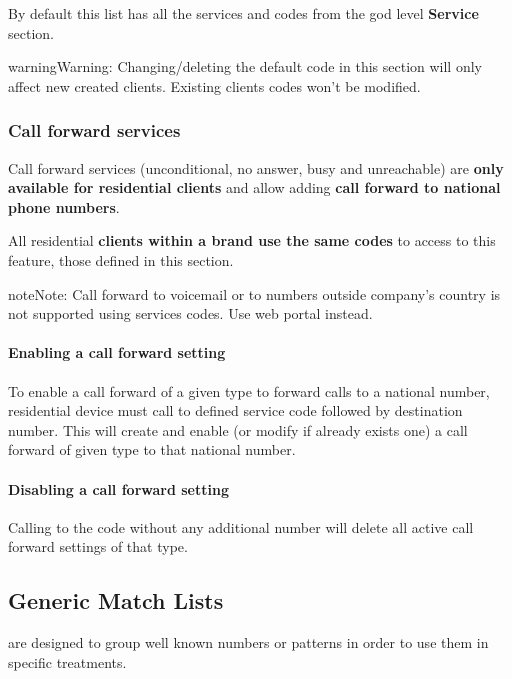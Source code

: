 \documentclass[letterpaper,10pt,english]{sphinxmanual}
\begin{document}
By default this list has all the services and codes from the god level \textbf{Service} section.

\begin{notice}{warning}{Warning:}
Changing/deleting the default code in this section will only affect new created clients. Existing clients codes won't
be modified.
\end{notice}


\subsubsection{Call forward services}
\label{administration_portal/brand/settings/generic_services:call-forward-services}
Call forward services (unconditional, no answer, busy and unreachable) are \textbf{only available for residential clients}
and allow adding \textbf{call forward to national phone numbers}.

All residential \textbf{clients within a brand use the same codes} to access to this feature, those defined in this section.

\begin{notice}{note}{Note:}
Call forward to voicemail or to numbers outside company's country is not supported using services codes.
Use web portal instead.
\end{notice}
\paragraph{Enabling a call forward setting}

To enable a call forward of a given type to forward calls to a national number, residential device must call to defined
service code followed by destination number. This will create and enable (or modify if already exists one) a call
forward of given type to that national number.
\paragraph{Disabling a call forward setting}

Calling to the code without any additional number will delete all active call forward settings of that type.


\subsection{Generic Match Lists}
\label{administration_portal/brand/settings/generic_match_lists:generic-match-lists}\label{administration_portal/brand/settings/generic_match_lists::doc}\label{administration_portal/brand/settings/generic_match_lists:brand-match-lists}
{\hyperref[administration_portal/client/vpbx/routing_tools/match_lists:match\string-lists]{}} are designed to group well known numbers or patterns in order to use them in specific treatments.
\end{document}
